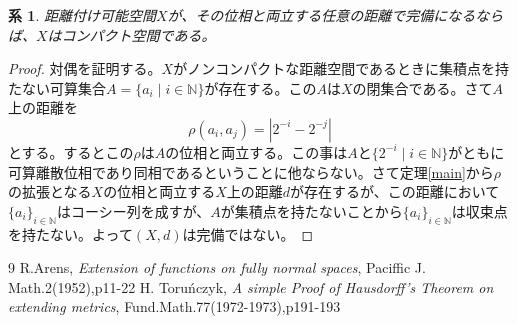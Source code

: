 \documentclass[leqno]{jsarticle}
\newtheorem{cor}[thm]{系}
\newcommand{\nn}{\mathbb{N}}
\begin{document}
\begin{cor}
距離付け可能空間$X$が、その位相と両立する任意の距離で完備になるならば、$X$はコンパクト空間である。
\end{cor}
\begin{proof}
対偶を証明する。$X$がノンコンパクトな距離空間であるときに集積点を持たない可算集合$A=\{a_i\mid i\in \nn\}$が存在する。この$A$は$X$の閉集合である。さて$A$上の距離を
\[
\rho(a_i,a_j)=|2^{-i}-2^{-j}|
\]
とする。するとこの$\rho$は$A$の位相と両立する。この事は$A$と$\{2^{-i}\mid i\in \nn\}$がともに可算離散位相であり同相であるということに他ならない。さて定理\ref{main}から$\rho$の拡張となる$X$の位相と両立する$X$上の距離$d$が存在するが、この距離において$\{a_i\}_{i\in \nn}$はコーシー列を成すが、$A$が集積点を持たないことから$\{a_i\}_{i\in \nn}$は収束点を持たない。よって$(X,d)$は完備ではない。
\end{proof}














	
\begin{thebibliography}{9}
R.Arens, \textit{Extension of functions on fully normal spaces}, Paciffic J. Math.2(1952),p11-22
H. Toru\'nczyk, \textit{A simple Proof of Hausdorff's Theorem on extending metrics}, Fund.Math.77(1972-1973),p191-193
\end{thebibliography}




			
\end{document}
